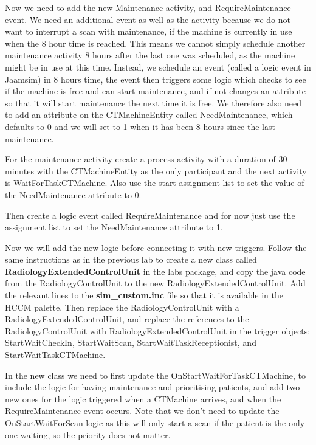 \documentclass[
  10pt,
  a4paperpaper,
  DIV=11,
  numbers=noendperiod,
  oneside]{scrreprt}
\begin{document}
Now we need to add the new Maintenance activity, and RequireMaintenance
event. We need an additional event as well as the activity because we do
not want to interrupt a scan with maintenance, if the machine is
currently in use when the 8 hour time is reached. This means we cannot
simply schedule another maintenance activity 8 hours after the last one
was scheduled, as the machine might be in use at this time. Instead, we
schedule an event (called a logic event in Jaamsim) in 8 hours time, the
event then triggers some logic which checks to see if the machine is
free and can start maintenance, and if not changes an attribute so that
it will start maintenance the next time it is free. We therefore also
need to add an attribute on the CTMachineEntity called NeedMaintenance,
which defaults to 0 and we will set to 1 when it has been 8 hours since
the last maintenance.

For the maintenance activity create a process activity with a duration
of 30 minutes with the CTMachineEntity as the only participant and the
next activity is WaitForTaskCTMachine. Also use the start assignment
list to set the value of the NeedMaintenance attribute to 0.

Then create a logic event called RequireMaintenance and for now just use
the assignment list to set the NeedMaintenance attribute to 1.

Now we will add the new logic before connecting it with new triggers.
Follow the same instructions as in the previous lab to create a new
class called \textbf{RadiologyExtendedControlUnit} in the labs package,
and copy the java code from the RadiologyControlUnit to the new
RadiologyExtendedControlUnit. Add the relevant lines to the
\textbf{sim\_custom.inc} file so that it is available in the HCCM
palette. Then replace the RadiologyControlUnit with a
RadiologyExtendedControlUnit, and replace the references to the
RadiologyControlUnit with RadiologyExtendedControlUnit in the trigger
objects: StartWaitCheckIn, StartWaitScan, StartWaitTaskReceptionist, and
StartWaitTaskCTMachine.

In the new class we need to first update the
OnStartWaitForTaskCTMachine, to include the logic for having maintenance
and prioritising patients, and add two new ones for the logic triggered
when a CTMachine arrives, and when the RequireMaintenance event occurs.
Note that we don't need to update the OnStartWaitForScan logic as this
will only start a scan if the patient is the only one waiting, so the
priority does not matter.
\end{document}
